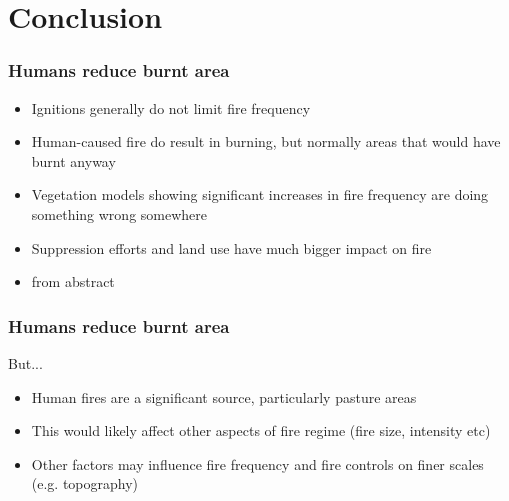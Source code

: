 \section{Conclusion}


\begin{frame}
    \frametitle{Humans reduce burnt area}
	\begin{itemize}
		\item Ignitions generally do not limit fire frequency
		\item Human-caused fire do result in burning, but normally areas that would have burnt anyway
		\item Vegetation models showing significant increases in fire frequency are doing something wrong somewhere
		\item Suppression efforts and land use have much bigger impact on fire
		\item from abstract
	\end{itemize}
\end{frame}
\begin{frame}
    \frametitle{Humans reduce burnt area}
	\large{But...}
	\begin{itemize}
		\item Human fires are a significant source, particularly pasture areas
		\item This would likely affect other aspects of fire regime (fire size, intensity etc)
		\item Other factors may influence fire frequency and fire controls on finer scales (e.g. topography)
	\end{itemize}
\end{frame}
